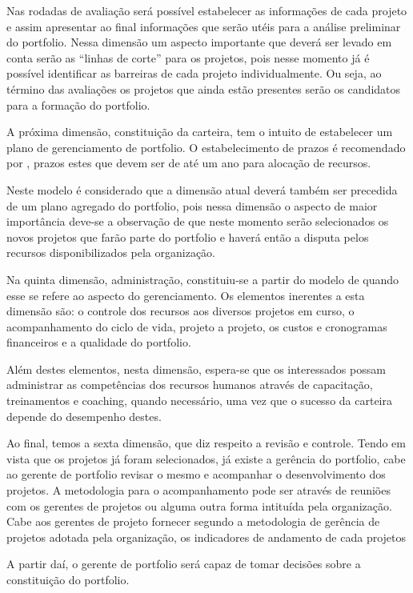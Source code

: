 \documentclass[12pt,a4paper,ruledheader,tocpage=prefix,floatnumber=continuous,pagestart=folhaderosto,font=times]{abnt}
\begin{document}
Nas rodadas de avaliação será possível estabelecer as informações de cada projeto e assim apresentar ao final informações que serão utéis para a análise 
preliminar do portfolio. Nessa dimensão um aspecto importante que deverá ser levado em conta serão as ``linhas de corte'' para os projetos, pois nesse 
momento já é possível identificar as barreiras de cada projeto individualmente. Ou seja, ao término das avaliações os projetos que ainda estão presentes 
serão os candidatos para a formação do portfolio.

A próxima dimensão, constituição da carteira, tem o intuito de estabelecer um plano de gerenciamento de portfolio. O estabelecimento de prazos é 
recomendado por \cite{clark}, prazos estes que devem ser de até um ano para alocação de recursos. 

Neste modelo é considerado que a dimensão atual deverá também ser precedida de um plano agregado do portfolio, pois nessa dimensão o aspecto de maior 
importância deve-se a observação de que neste momento serão selecionados os novos projetos que farão parte do portfolio e haverá então a disputa pelos 
recursos disponibilizados pela organização.

Na quinta dimensão, administração, constituiu-se a partir do modelo de \cite{crawford} quando esse se refere ao aspecto do gerenciamento. Os elementos 
inerentes a esta dimensão são: o controle dos recursos aos diversos projetos em curso, o acompanhamento do ciclo de vida, projeto a projeto, os custos e 
cronogramas financeiros e a qualidade do portfolio. 

Além destes elementos, nesta dimensão, espera-se que os interessados possam administrar as competências dos recursos humanos através de capacitação, 
treinamentos e coaching, quando necessário, uma vez que o sucesso da carteira depende do desempenho destes.

Ao final, temos a sexta dimensão, que diz respeito a revisão e controle. Tendo em vista que os projetos já foram selecionados, já existe a gerência do 
portfolio, cabe ao gerente de portfolio revisar o mesmo e acompanhar o desenvolvimento dos projetos. A metodologia para o acompanhamento pode ser através 
de reuniões com os gerentes de projetos ou alguma outra forma intituída pela organização. Cabe aos gerentes de projeto fornecer segundo a metodologia de 
gerência de projetos adotada pela organização, os indicadores de andamento de cada projetos

A partir daí, o gerente de portfolio será capaz de tomar decisões sobre a constituição do portfolio.
\end{document}
